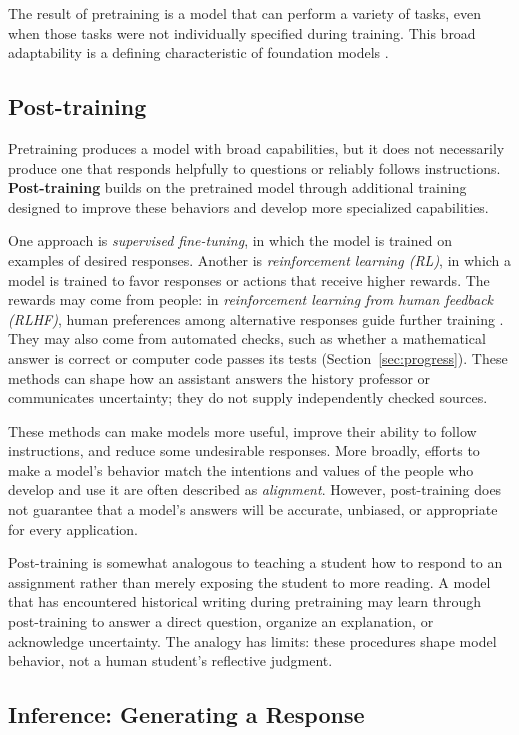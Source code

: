 \documentclass[11pt]{article}
\begin{document}
The result of pretraining is a model that can perform
a variety of tasks, even when those tasks were not
individually specified during training. This broad
adaptability is a defining characteristic of foundation
models \citep{Bommasani2021}.

\subsection{Post-training}

Pretraining produces a model with broad capabilities,
but it does not necessarily produce one that responds
helpfully to questions or reliably follows instructions.
\textbf{Post-training} builds on the pretrained model
through additional training designed to improve these
behaviors and develop more specialized capabilities.


One approach is \emph{supervised fine-tuning}, in which
the model is trained on examples of desired responses.
Another is \emph{reinforcement learning (RL)}, in which a model
is trained to favor responses or actions that receive higher
rewards. The rewards may come from people: in
\emph{reinforcement learning from human feedback (RLHF)},
human preferences among alternative responses guide further
training \citep{Ouyang2022}. They may also come from automated
checks, such as whether a mathematical answer is correct or
computer code passes its tests (Section~\ref{sec:progress}).
These methods can shape how an assistant answers the history
professor or communicates uncertainty; they do not supply
independently checked sources.

These methods can make models more useful, improve their
ability to follow instructions, and reduce some undesirable
responses. More broadly, efforts to make a model's behavior
match the intentions and values of the people who develop
and use it are often described as \emph{alignment}.
However, post-training does not guarantee that a model's
answers will be accurate, unbiased, or appropriate for
every application.

Post-training is somewhat analogous to teaching a student
how to respond to an assignment rather than merely exposing
the student to more reading. A model that has encountered
historical writing during pretraining may learn through
post-training to answer a direct question, organize an
explanation, or acknowledge uncertainty. The analogy has
limits: these procedures shape model behavior, not a human
student's reflective judgment.

\subsection{Inference: Generating a Response}\label{sec:inference}
\end{document}
